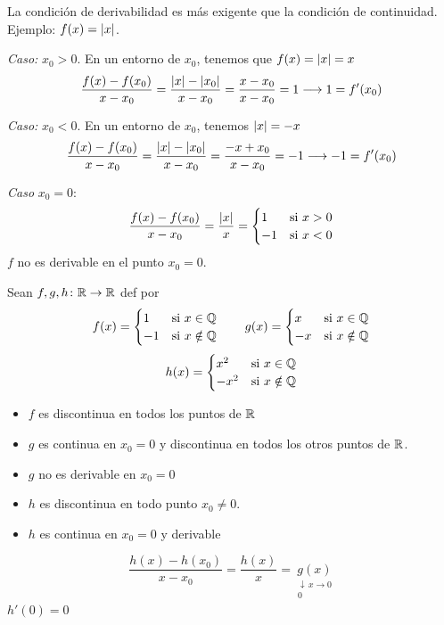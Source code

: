 \documentclass[11pt,a4paper]{article}
\newcommand{\abajo}[3][]{\underset{\substack{\downarrow\,#1\\ #3}}{#2}}
\begin{document}
\begin{observacion}
  La condición de derivabilidad es más exigente que la condición de
  continuidad. Ejemplo: $f(x)=\lvert x\rvert$.

  \begin{center}
  \end{center}

  \textit{Caso:} $x_0>0$. En un entorno de $x_0$, tenemos que
  $f(x)=\lvert x\rvert=x$
  \[
    \frac{f(x)-f(x_0)}{x-x_0}=\frac{\lvert x\rvert-\lvert x_0\rvert}{x-x_0}
    =\frac{x-x_0}{x-x_0}=1\longrightarrow 1=f'(x_0)
  \]

  \textit{Caso:} $x_0<0$. En un entorno de $x_0$, tenemos
  $\lvert x\rvert=-x$
  \[
    \frac{f(x)-f(x_0)}{x-x_0}=\frac{\lvert x\rvert-\lvert x_0\rvert}{x-x_0}
    =\frac{-x+x_0}{x-x_0}=-1\longrightarrow -1=f'(x_0)
  \]

  \textit{Caso} $x_0=0$:
  \[
    \frac{f(x)-f(x_0)}{x-x_0}=\frac{\lvert x\rvert}{x}=
    \begin{cases}
      1 & \text{si } x>0\\
      -1 & \text{si } x<0
    \end{cases}
  \]
  $f$ no es derivable en el punto $x_0=0$.
\end{observacion}

\begin{ejemplo}
  Sean $f,g,h\colon\mathbb{R}\to\mathbb{R}$ def por
  \[
    f(x)=\begin{cases}
      1 & \text{si } x\in\mathbb{Q}\\
      -1 & \text{si } x\notin\mathbb{Q}
    \end{cases}
    \qquad
    g(x)=\begin{cases}
      x & \text{si } x\in\mathbb{Q}\\
      -x & \text{si } x\notin\mathbb{Q}
    \end{cases}
  \]
  \[
    h(x)=\begin{cases}
      x^2 & \text{si } x\in\mathbb{Q}\\
      -x^2 & \text{si } x\notin\mathbb{Q}
    \end{cases}
  \]
  \begin{itemize}
    \item $f$ es discontinua en todos los puntos de $\mathbb{R}$
    \item $g$ es continua en $x_0=0$ y discontinua en todos los otros
      puntos de $\mathbb{R}$.
    \item[--] $g$ no es derivable en $x_0=0$
    \item $h$ es discontinua en todo punto $x_0\neq 0$.
    \item $h$ es continua en $x_0=0$ y derivable
  \end{itemize}
  \[
    \frac{h(x)-h(x_0)}{x-x_0}=\frac{h(x)}{x}=\abajo[x\to 0]{g(x)}{0}
  \]
  $h'(0)=0$
\end{ejemplo}
\end{document}
